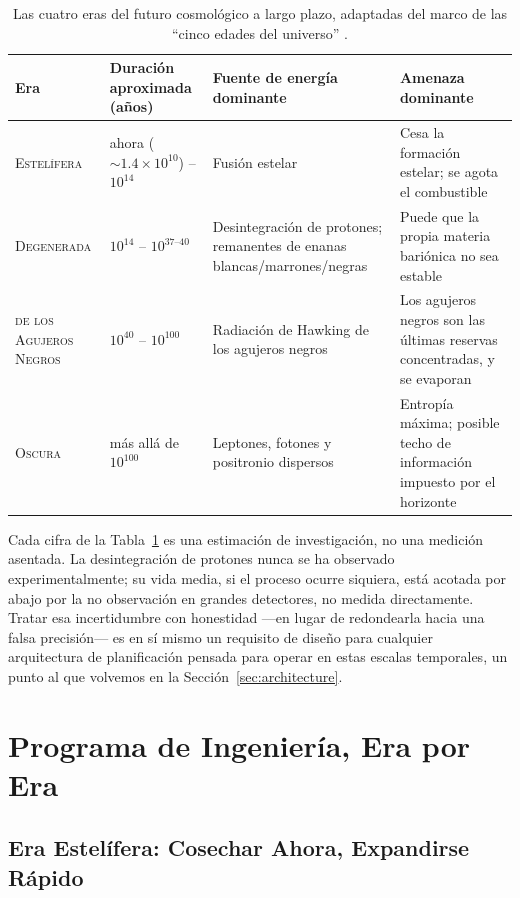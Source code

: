 \documentclass[11pt]{article}
\newcommand{\eera}[1]{\textsc{#1}}
\begin{document}
\begin{table}[h]
\centering
\small
\begin{tabular}{@{}p{2.6cm}p{3.6cm}p{4cm}p{4cm}@{}}
\toprule
\textbf{Era} & \textbf{Duración aproximada (años)} & \textbf{Fuente de energía dominante} & \textbf{Amenaza dominante} \\
\midrule
\eera{Estelífera} & ahora ($\sim 1.4\times10^{10}$) -- $10^{14}$ & Fusión estelar & Cesa la formación estelar; se agota el combustible \\
\eera{Degenerada} & $10^{14}$ -- $10^{37\text{--}40}$ & Desintegración de protones; remanentes de enanas blancas/marrones/negras & Puede que la propia materia bariónica no sea estable \\
\eera{de los Agujeros Negros} & $10^{40}$ -- $10^{100}$ & Radiación de Hawking de los agujeros negros & Los agujeros negros son las últimas reservas concentradas, y se evaporan \\
\eera{Oscura} & más allá de $10^{100}$ & Leptones, fotones y positronio dispersos & Entropía máxima; posible techo de información impuesto por el horizonte \\
\bottomrule
\end{tabular}
\caption{Las cuatro eras del futuro cosmológico a largo plazo, adaptadas del marco de las ``cinco edades del universo'' \citep{adams1997dying}.}
\label{tab:eras}
\end{table}

Cada cifra de la Tabla~\ref{tab:eras} es una estimación de investigación, no una medición asentada. La desintegración de protones nunca se ha observado experimentalmente; su vida media, si el proceso ocurre siquiera, está acotada por abajo por la no observación en grandes detectores, no medida directamente. Tratar esa incertidumbre con honestidad —en lugar de redondearla hacia una falsa precisión— es en sí mismo un requisito de diseño para cualquier arquitectura de planificación pensada para operar en estas escalas temporales, un punto al que volvemos en la Sección~\ref{sec:architecture}.

\section{Programa de Ingeniería, Era por Era}
\label{sec:engineering}

\subsection{Era Estelífera: Cosechar Ahora, Expandirse Rápido}
\label{sec:stelliferous}
\end{document}
